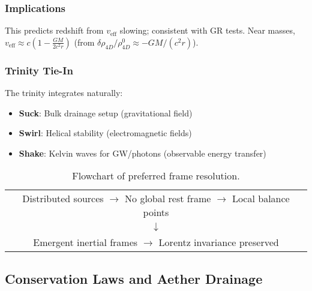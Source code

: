 \subsubsection{Implications}

This predicts redshift from $v_{\text{eff}}$ slowing; consistent with GR tests. Near masses, $v_{\text{eff}} \approx c \left(1 - \frac{G M}{2 c^2 r}\right)$ (from $\delta \rho_{4D} / \rho_{4D}^0 \approx - G M / (c^2 r)$).

\subsubsection{Trinity Tie-In}

The trinity integrates naturally:
\begin{itemize}
\item \textbf{Suck}: Bulk drainage setup (gravitational field)
\item \textbf{Swirl}: Helical stability (electromagnetic fields)
\item \textbf{Shake}: Kelvin waves for GW/photons (observable energy transfer)
\end{itemize}

\begin{table}[h]
\centering
\begin{tabular}{c}
Distributed sources $\to$ No global rest frame $\to$ Local balance points \\
$\downarrow$ \\
Emergent inertial frames $\to$ Lorentz invariance preserved
\end{tabular}
\caption{Flowchart of preferred frame resolution.}
\label{tab:frame-flow}
\end{table}

\medskip

\subsection{Conservation Laws and Aether Drainage}

